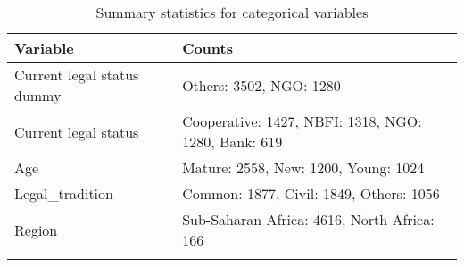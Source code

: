 \documentclass[a4paper,nobind]{templates/ociamthesis}
\begin{document}
\begin{table}

\caption{\label{tab:unnamed-chunk-15}Summary statistics for categorical variables}
\centering
\begin{tabu} to 
\toprule
Variable & Counts\\
\midrule
Current legal status dummy & Others: 3502, NGO: 1280\\
Current legal status & Cooperative: 1427, NBFI: 1318, NGO: 1280, Bank: 619\\
Age & Mature: 2558, New: 1200, Young: 1024\\
Legal\_tradition & Common: 1877, Civil: 1849, Others: 1056\\
Region & Sub-Saharan Africa: 4616, North Africa: 166\\
\bottomrule
{}\\
\end{tabu}
\end{table}
\end{document}
